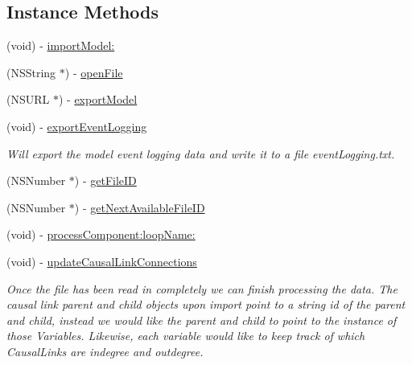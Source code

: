 \subsection*{Instance Methods}
\begin{DoxyCompactItemize}
\item 
(void) -\/ \hyperlink{interface_file_i_o_a2bb3d58ae1f0fac924e831a424e1365b}{import\-Model\-:}
\item 
(N\-S\-String $\ast$) -\/ \hyperlink{interface_file_i_o_a521b8da51a857f38be6622a220cf70c5}{open\-File}
\item 
(N\-S\-U\-R\-L $\ast$) -\/ \hyperlink{interface_file_i_o_ae00d68df671c5290f0e6774adf469f49}{export\-Model}
\item 
\hypertarget{interface_file_i_o_ab012ca0b3749e8e0fb26a09a92d28d02}{(void) -\/ \hyperlink{interface_file_i_o_ab012ca0b3749e8e0fb26a09a92d28d02}{export\-Event\-Logging}}\label{interface_file_i_o_ab012ca0b3749e8e0fb26a09a92d28d02}

\begin{DoxyCompactList}\small\item\em Will export the model event logging data and write it to a file event\-Logging.\-txt. \end{DoxyCompactList}\item 
(N\-S\-Number $\ast$) -\/ \hyperlink{interface_file_i_o_a628a9ac631ce93a2e49ac8155b62eaf1}{get\-File\-I\-D}
\item 
(N\-S\-Number $\ast$) -\/ \hyperlink{interface_file_i_o_a305324f84521a6c2966a744c620c6009}{get\-Next\-Available\-File\-I\-D}
\item 
(void) -\/ \hyperlink{interface_file_i_o_a00a3fe9bd4e7c407327987606c18028a}{process\-Component\-:loop\-Name\-:}
\item 
\hypertarget{interface_file_i_o_a0282f6418e27f223af8dc89cc5142d31}{(void) -\/ \hyperlink{interface_file_i_o_a0282f6418e27f223af8dc89cc5142d31}{update\-Causal\-Link\-Connections}}\label{interface_file_i_o_a0282f6418e27f223af8dc89cc5142d31}

\begin{DoxyCompactList}\small\item\em Once the file has been read in completely we can finish processing the data. The causal link parent and child objects upon import point to a string id of the parent and child, instead we would like the parent and child to point to the instance of those Variables. Likewise, each variable would like to keep track of which Causal\-Links are indegree and outdegree. \end{DoxyCompactList}\end{DoxyCompactItemize}
